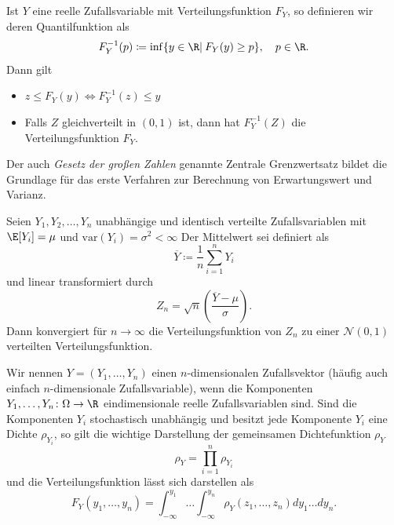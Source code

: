 \begin{maththeorem}[Inversionsmethode]
\label{thinversionsmethode}
Ist $Y$ eine reelle Zufallsvariable mit Verteilungsfunktion $F_Y$, so definieren wir deren Quantilfunktion als
\[F_Y^{-1}(p)\coloneqq \inf\lbrace y\in\R |\: F_Y(y)\ge p\rbrace,\quad p\in\R.\]
Dann gilt
\begin{itemize}
\item $z\le F_Y(y)\iff F_Y^{-1}(z)\le y$\\
\item Falls $Z$ gleichverteilt in $(0,1)$ ist, dann hat $F_Y^{-1}(Z)$ die Verteilungsfunktion $F_Y$. 
\end{itemize}
\end{maththeorem}
Der auch \emph{Gesetz der großen Zahlen} genannte Zentrale Grenzwertsatz bildet die Grundlage für das erste Verfahren zur Berechnung von Erwartungswert und Varianz.
\begin{maththeorem}
\label{thzentralgrenzwert}
Seien $Y_1,Y_2,\dots,Y_n$ unabhängige und identisch verteilte Zufallsvariablen mit $\E[Y_i]=\mu$ und $\text{var}(Y_i)=\sigma^2<\infty$ Der Mittelwert sei definiert als
\[\overline{Y}\coloneqq \frac{1}{n}\sum_{i=1}^nY_i\]
und linear transformiert durch
\[Z_n=\sqrt{n}\left(\frac{\overline{Y}-\mu}{\sigma}\right).\]
Dann konvergiert für $n\to\infty$ die Verteilungsfunktion von $Z_n$ zu einer $\mathcal{N}(0,1)$ verteilten Verteilungsfunktion.
\end{maththeorem}
\begin{mathdef}[Zufallsvektoren]
Wir nennen $Y=(Y_1,\dots,Y_n)$ einen $n$-dimensionalen Zufallsvektor (häufig auch einfach $n$-dimensionale Zufallsvariable), wenn die Komponenten $Y_1,\dots,Y_n\colon\Omega\to\R$ eindimensionale reelle Zufallsvariablen sind. Sind die Komponenten $Y_i$ stochastisch unabhängig und besitzt jede Komponente $Y_i$ eine Dichte $\rho_{Y_i}$, so gilt die wichtige Darstellung der gemeinsamen Dichtefunktion $\rho_Y$
\[\rho_Y=\prod_{i=1}^n \rho_{Y_i}\]
und die Verteilungsfunktion lässt sich darstellen als
\[F_Y(y_1,\dots,y_n)=\int_{-\infty}^{y_1}\dots\int_{-\infty}^{y_n}\rho_Y(z_1,\dots,z_n)dy_1\dots dy_n.\]
\end{mathdef}

